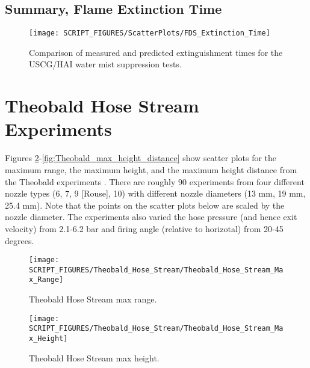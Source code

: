 \clearpage

\subsection{Summary, Flame Extinction Time}
\label{Extinction Time}

\begin{figure}[h!]
\begin{center}
\texttt{[image: SCRIPT\_FIGURES/ScatterPlots/FDS\_Extinction\_Time]}
\caption[Extinguishment times for the USCG/HAI water mist suppression tests]{Comparison of measured and predicted extinguishment times for the USCG/HAI water mist suppression tests.}
\label{USCG_Scatter}
\end{center}
\end{figure}

\clearpage

\section{Theobald Hose Stream Experiments}

Figures \ref{fig:Theobald_max_range}-\ref{fig:Theobald_max_height_distance} show scatter plots for the maximum range, the maximum height, and the maximum height distance from the Theobald experiments \cite{Theobald:1981}.  There are roughly 90 experiments from four different nozzle types (6, 7, 9 [Rouse], 10) with different nozzle diameters (13 mm, 19 mm, 25.4 mm).  Note that the points on the scatter plots below are scaled by the nozzle diameter.  The experiments also varied the hose pressure (and hence exit velocity) from 2.1-6.2 bar and firing angle (relative to horizotal) from 20-45 degrees.

\begin{figure}[h!]
\begin{center}
\texttt{[image: SCRIPT\_FIGURES/Theobald\_Hose\_Stream/Theobald\_Hose\_Stream\_Max\_Range]}
\caption[Theobald Hose Stream max range]{Theobald Hose Stream max range.}
\label{fig:Theobald_max_range}
\end{center}
\end{figure}

\begin{figure}[h!]
\begin{center}
\texttt{[image: SCRIPT\_FIGURES/Theobald\_Hose\_Stream/Theobald\_Hose\_Stream\_Max\_Height]}
\caption[Theobald Hose Stream max range]{Theobald Hose Stream max height.}
\label{fig:Theobald_max_height}
\end{center}
\end{figure}

